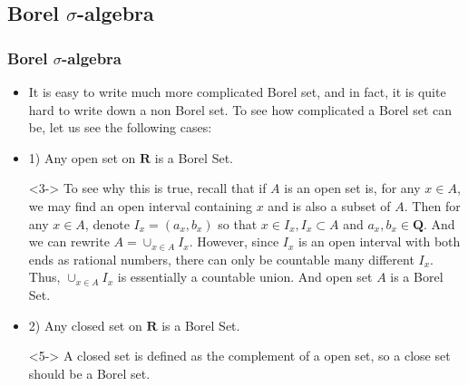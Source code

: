 \documentclass[handout]{beamer}
\begin{document}
\subsection{Borel $\sigma$-algebra}
\frame
{
  \frametitle{Borel $\sigma$-algebra}

   \begin{itemize}

      
       \item<1->  It is easy to write much more complicated Borel set, and in fact, it is quite hard to write down a non Borel set. To see how complicated a Borel set can be, let us see the following cases: 
       
            \item<2-> 1) Any open set on $\mathbf{R}$ is a Borel Set. 
            \item[]<3-> To see why this is true, recall that if $A$ is an open set is, for any $x\in A$, we may find an open interval containing $x$ and is also a subset of $A$. Then for any $x\in A$, denote $I_x=(a_x, b_x)$ so that $x \in I_x, I_x\subset A$ and $a_x, b_x \in \mathbf{Q}$. And we can rewrite $A=\cup_{x\in A} I_x$. However, since $I_x$ is an open interval with both ends as rational numbers, there can only be countable many different $I_x$. Thus, $\cup_{x\in A} I_x$ is essentially a countable union. And open set $A$ is a Borel Set. 
            
            \item<4-> 2) Any closed set on $\mathbf{R}$ is a Borel Set. 
            \item[]<5->  A closed set is defined as the complement of a open set, so a close set should be a Borel set. 
            
                 \end{itemize}
}
\end{document}
